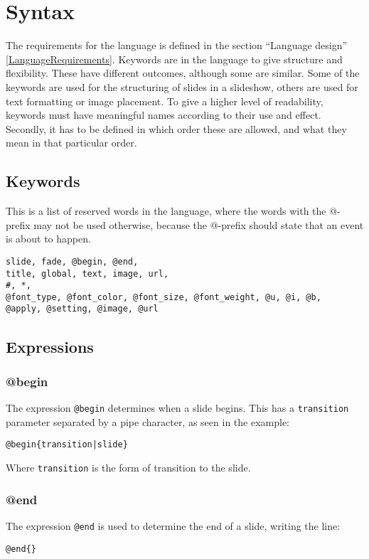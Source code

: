 \chapter{Syntax}
\label{SSyntax}

The requirements for the language is defined in the section ``Language design'' \ref{LanguageRequirements}. Keywords are in the language to give structure and flexibility. These have different outcomes, although some are similar. Some of the keywords are used for the structuring of slides in a slideshow, others are used for text formatting or image placement. To give a higher level of readability, keywords must have meaningful names according to their use and effect. Secondly, it has to be defined in which order these are allowed, and what they mean in that particular order.

\section{Keywords}
This is a list of reserved words in the language, where the words with the @-prefix may not be used otherwise, because the @-prefix should state that an event is about to happen.

\begin{lstlisting}[frame=single]
slide, fade, @begin, @end, 
title, global, text, image, url,  
#, *, 
@font_type, @font_color, @font_size, @font_weight, @u, @i, @b, 
@apply, @setting, @image, @url
\end{lstlisting}

\section{Expressions}

\subsection{@begin}
\label{@begin}
The expression \texttt{@begin} determines when a slide begins. This has a \texttt{transition} parameter separated by a pipe character, as seen in the example:
\begin{lstlisting}[frame=single]
@begin{transition|slide}
\end{lstlisting}
Where \texttt{transition} is the form of transition to the slide. 

\subsection{@end}
\label{@end}
The expression \texttt{@end} is used to determine the end of a slide, writing the line: 
\begin{lstlisting}[frame=single]
@end{}
\end{lstlisting}

